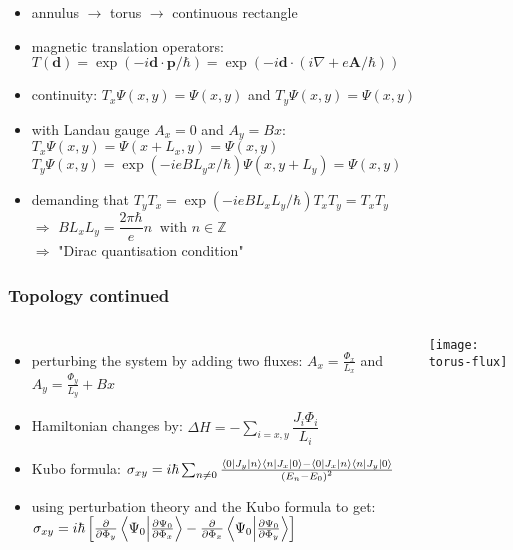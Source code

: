 \begin{frame}
	\begin{itemize}
	\item annulus $\rightarrow$ torus $\rightarrow$ continuous rectangle
	\item magnetic translation operators: $T(\boldsymbol{d}) = \exp(-i\boldsymbol{d}\cdot \boldsymbol{p}/\hbar) = 		\exp(-i\boldsymbol{d}\cdot(i\nabla +e\boldsymbol{A}/\hbar))$
	\item continuity: $T_x \Psi(x,y) = \Psi(x,y)$ and $T_y \Psi(x,y) = \Psi(x,y)$
	\item with Landau gauge $A_x = 0$ and $A_y = Bx$:\\
	$T_x \Psi(x,y) = \Psi(x+L_x, y) = \Psi(x,y)$\\
	$T_y \Psi(x,y) = \exp(-ieBL_yx/\hbar)\Psi(x, y+L_y) = \Psi(x,y)$
	\item demanding that $T_y T_x = \exp(-ieBL_xL_y/\hbar)T_x T_y = T_x T_y$ \\
	$\Rightarrow$ $BL_x L_y = \dfrac{2\pi\hbar}{e} n \:\text{ with } n \in \mathbb{Z}\qquad$ \\
	$\Rightarrow$ "Dirac quantisation condition"
	\end{itemize}

\end{frame}


\begin{frame}
\frametitle{Topology continued}
\begin{columns}
	\column[]{8cm}
	\begin{itemize}
		\item perturbing the system by adding two fluxes:
		$A_x = \frac{\Phi_x}{L_x}$ \quad and \quad $A_y = \frac{\Phi_y}{L_y} +Bx$
		\item Hamiltonian changes by:
		$\Delta H = - \sum_{i=x,y} \dfrac{J_i \Phi_i}{L_i}$
		\item Kubo formula: $ \sigma_{xy} = i\hbar \sum_{n\neq0} \frac{\bra{0}J_y\ket{n}\bra{n}J_x\ket{0}-\bra{0}J_x\ket{n}\bra{n}J_y\ket{0}}{\left( E_n -E_0\right)^2}$
		\item using perturbation theory and the Kubo formula to get:
		$\sigma_{xy} = i\hbar \left[\frac{\partial}{\partial \Phi_y} \braket{\Psi_0}{\frac{\partial \Psi_0}{\partial \Phi_x}} - \frac{\partial}{\partial \Phi_x} \braket{\Psi_0}{\frac{\partial \Psi_0}{\partial \Phi_y}}\right]$
	\end{itemize}
	\column[]{4cm}
	\texttt{[image: torus-flux]}
	
\end{columns}

\end{frame}

